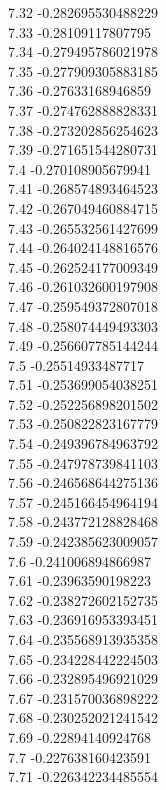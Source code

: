 {7.32	-0.282695530488229\\
7.33	-0.28109117807795\\
7.34	-0.279495786021978\\
7.35	-0.277909305883185\\
7.36	-0.27633168946859\\
7.37	-0.274762888828331\\
7.38	-0.273202856254623\\
7.39	-0.271651544280731\\
7.4	-0.270108905679941\\
7.41	-0.268574893464523\\
7.42	-0.267049460884715\\
7.43	-0.265532561427699\\
7.44	-0.264024148816576\\
7.45	-0.262524177009349\\
7.46	-0.261032600197908\\
7.47	-0.259549372807018\\
7.48	-0.258074449493303\\
7.49	-0.256607785144244\\
7.5	-0.25514933487717\\
7.51	-0.253699054038251\\
7.52	-0.252256898201502\\
7.53	-0.250822823167779\\
7.54	-0.249396784963792\\
7.55	-0.247978739841103\\
7.56	-0.246568644275136\\
7.57	-0.245166454964194\\
7.58	-0.243772128828468\\
7.59	-0.242385623009057\\
7.6	-0.241006894866987\\
7.61	-0.23963590198223\\
7.62	-0.238272602152735\\
7.63	-0.236916953393451\\
7.64	-0.235568913935358\\
7.65	-0.234228442224503\\
7.66	-0.232895496921029\\
7.67	-0.231570036898222\\
7.68	-0.230252021241542\\
7.69	-0.22894140924768\\
7.7	-0.227638160423591\\
7.71	-0.226342234485554\\
}
